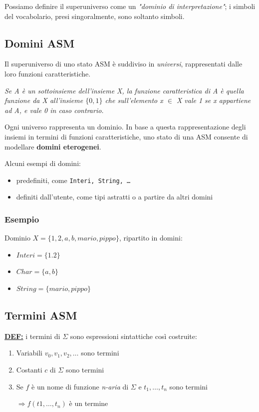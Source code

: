 \noindent Possiamo definire il superuniverso come un \textit{"dominio di 
interpretazione"}; i simboli del vocabolario, presi singoralmente, sono soltanto simboli.

\subsection{Domini ASM}
Il superuniverso di uno stato ASM è suddiviso in \textit{universi}, 
rappresentati dalle loro funzioni caratteristiche.

\begin{center}
    \textit{Se A è un sottoinsieme dell'insieme X, la funzione caratteristica di A è quella 
    funzione da X all'insieme $\{0 , 1\}$ che sull'elemento x $\in$ X vale 1 se x appartiene ad A, e vale 0 in caso contrario.  }
\end{center}

\noindent Ogni universo rappresenta un dominio. In base a questa 
rappresentazione degli insiemi in termini di funzioni caratteristiche, uno stato di una 
ASM consente di modellare \textbf{domini eterogenei}.

\noindent Alcuni esempi di domini:
\begin{itemize}
    \item predefiniti, come \texttt{Interi, String, \dots}
    \item definiti dall'utente, come tipi astratti o a partire da altri domini
\end{itemize}

\subsubsection{Esempio}
Dominio $X=\{1,2,a,b,mario,pippo\}$, ripartito in domini:
\begin{itemize}
    \item $Interi = \{1.2\}$
    \item $Char = \{a,b\}$
    \item $String = \{mario, pippo\}$
\end{itemize}

\subsection{Termini ASM}
\underline{\textbf{DEF:}} i termini di $\Sigma$ sono espressioni sintattiche così costruite:
\begin{enumerate}
    \item Variabili $v_0, v_1, v_2, \dots$ sono termini 
    \item Costanti $c$ di $\Sigma$ sono termini 
    \item Se $f$ è un nome di funzione \textit{n-aria} di $\Sigma$ e 
    $t_1, \dots, t_n$ sono termini 
    
    $\Rightarrow f(t1, \dots, t_n)$ è un termine 
\end{enumerate}

